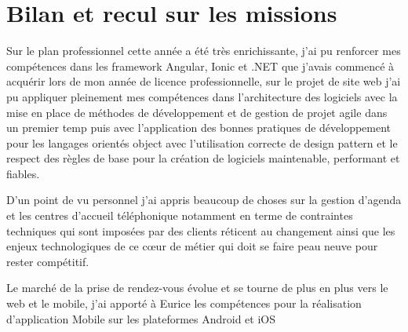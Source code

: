 \newpage

\section{Bilan et recul sur les missions}
Sur le plan professionnel cette année a été très enrichissante, j'ai pu renforcer mes compétences dans 
les framework Angular, Ionic et .NET que j'avais commencé à acquérir lors de mon année de licence 
professionnelle, sur le projet de site web j'ai pu appliquer pleinement mes compétences 
dans l'architecture des logiciels avec la mise en place de méthodes de développement et 
de gestion de projet agile dans un premier temp puis avec l'application des bonnes pratiques 
de développement pour les langages orientés object avec l'utilisation correcte de design pattern
et le respect des règles de base pour la création de logiciels maintenable, performant et fiables.
\newline

D'un point de vu personnel j'ai appris beaucoup de choses sur la gestion d'agenda et les centres d'accueil téléphonique notamment
en terme de contraintes techniques qui sont imposées par des clients réticent au changement 
ainsi que les enjeux technologiques de ce cœur de métier qui doit se faire peau neuve 
pour rester compétitif.

Le marché de la prise de rendez-vous évolue et se tourne de plus en plus vers le 
web et le mobile, j'ai apporté à Eurice les compétences pour la réalisation d'application 
Mobile sur les plateformes Android et iOS\newline
